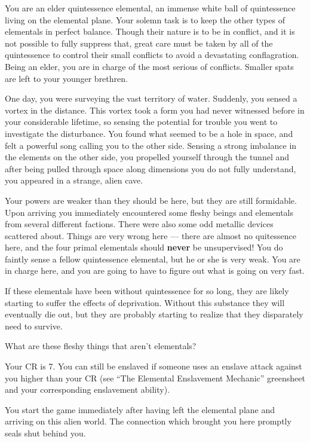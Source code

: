 \documentclass[char]{elementals}
\begin{document}
\name{\cElderQ{}}

You are an elder quintessence elemental, an immense white ball of quintessence living on the elemental plane.  Your solemn task is to keep the other types of elementals in perfect balance.  Though their nature is to be in conflict, and it is not possible to fully suppress that, great care must be taken by all of the quintessence to control their small conflicts to avoid a devastating conflagration. Being an elder, you are in charge of the most serious of conflicts. Smaller spats are left to your younger brethren.

One day, you were surveying the vast territory of water. Suddenly, you sensed a vortex in the distance. This vortex took a form you had never witnessed before in your considerable lifetime, so sensing the potential for trouble you went to investigate the disturbance. You found what seemed to be a hole in space, and felt a powerful song calling you to the other side. Sensing a strong imbalance in the elements on the other side, you propelled yourself through the tunnel and after being pulled through space along dimensions you do not fully understand, you appeared in a strange, alien cave.

Your powers are weaker than they should be here, but they are still formidable. Upon arriving you immediately encountered some fleshy beings and elementals from several different factions. There were also some odd metallic devices scattered about. Things are very wrong here --- there are almost no quitessence here, and the four primal elementals should \textbf{never} be unsupervised! You do faintly sense a fellow quintessence elemental, but he or she is very weak. You are in charge here, and you are going to have to figure out what is going on very fast.

If these elementals have been without quintessence for so long, they are likely starting to suffer the effects of \iWhiteQ{} deprivation. Without this substance they will eventually die out, but they are probably starting to realize that they disparately need \iWhiteQ{\MYname{}} to survive.

What are these fleshy things that aren't elementals?

Your CR is 7. You can still be enslaved if someone uses an enslave attack against you higher than your CR (see ``The Elemental Enslavement Mechanic'' greensheet and your corresponding enslavement ability).

You start the game immediately after having left the elemental plane and arriving on this alien world. The connection which brought you here promptly seals shut behind you.
\end{document}
